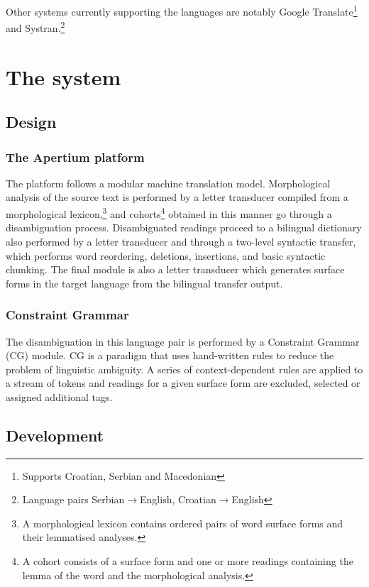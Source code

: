 \documentclass{book}
\begin{document}
Other systems currently supporting the languages are notably Google Translate\footnote{Supports Croatian, Serbian and Macedonian} and Systran.\footnote{Language pairs Serbian$\rightarrow$English, Croatian$\rightarrow$English}

\mainmatter

\chapter{The system}
\section{Design}
\subsection* {The Apertium platform}
\nocite{forcada2011apertium}
The platform follows a modular machine translation model.
Morphological analysis of the source text is performed by a letter 
transducer compiled from a morphological lexicon,\footnote{A morphological lexicon 
contains ordered pairs of word surface forms and their lemmatised analyses.} 
and cohorts\footnote{A cohort 
consists of a surface form and one or more readings containing the lemma of the 
word and the morphological analysis.} obtained in this manner go through
a disambiguation process. 
Disambiguated readings proceed to a bilingual dictionary also performed 
by a letter transducer and  through a two-level syntactic transfer, which performs word reordering, deletions, insertions, and basic syntactic chunking.
The final module is also a letter transducer which generates surface forms 
in the target language from the bilingual transfer output.

\subsection* {Constraint Grammar}
The 
disambiguation in this language pair is performed by a
Constraint Grammar (CG) module. CG is a 
paradigm that uses hand-written rules to reduce the problem 
of linguistic ambiguity. A series of context-dependent rules are applied 
to a stream of tokens and readings for a given surface form are excluded, 
selected or assigned additional tags.

\section{Development}
\end{document}

